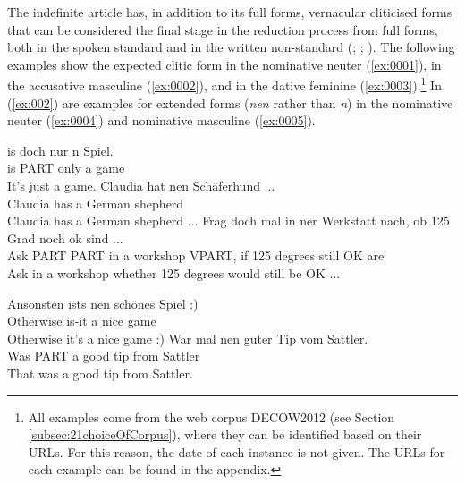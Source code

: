 
The indefinite article has, in addition to its full forms, vernacular cliticised forms that can be considered the final stage in the reduction process from full forms, both in the spoken standard and in the written non-standard (\citealt[190]{Eisenberg2013b}; \citealt[19]{Nuebling1992}; \citealt[112]{Nuebling2005}). %
The following examples show the expected clitic form in the nominative neuter (\ref{ex:0001}), in the accusative masculine (\ref{ex:0002}), and in the dative feminine (\ref{ex:0003}).\footnote{All examples come from the web corpus DECOW2012 (see Section \ref{subsec:21choiceOfCorpus}), where they can be identified based on their URLs. For this reason, the date of each instance is not given. The URLs for each example can be found in the appendix.}
In (\ref{ex:002}) are examples for extended forms (\textit{nen} rather than \textit{n}) in the nominative neuter (\ref{ex:0004}) and nominative masculine (\ref{ex:0005}).

\begin{exe}
\ex\label{ex:001}
	\begin{xlist}
	\ex\label{ex:0001}\gll is doch nur n Spiel.\\
	is PART only a game\\
	\trans It's just a game.
	\ex\label{ex:0002}\gll Claudia hat nen {Schäferhund ...}\\
	Claudia has a {German shepherd}\\
	\trans Claudia has a German shepherd ...
	\ex\label{ex:0003}\gll Frag doch mal in ner Werkstatt nach, ob 125 Grad noch ok {sind ...}\\
	Ask PART PART in a workshop VPART, if 125 degrees still OK are\\
	\trans Ask in a workshop whether 125 degrees would still be OK ...
	\end{xlist}
\ex\label{ex:002}
	\begin{xlist}
	\ex\label{ex:0004}\gll Ansonsten ists nen schönes Spiel :)\\
	Otherwise is-it a nice game\\
	\trans Otherwise it's a nice game :)
	\ex\label{ex:0005}\gll War mal nen guter Tip vom Sattler.\\
	Was PART a good tip from Sattler\\
	\trans That was a good tip from Sattler.
	\end{xlist}
\end{exe}

